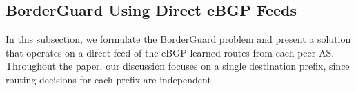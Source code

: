 
\subsection{BorderGuard Using Direct eBGP Feeds}
\label{sec:problem}
In this subsection, we formulate the BorderGuard problem and present a
solution that operates on a direct feed of the eBGP-learned routes
from each peer AS.  
Throughout the paper, our discussion focuses on a single destination prefix,
since routing decisions for each prefix are independent.


